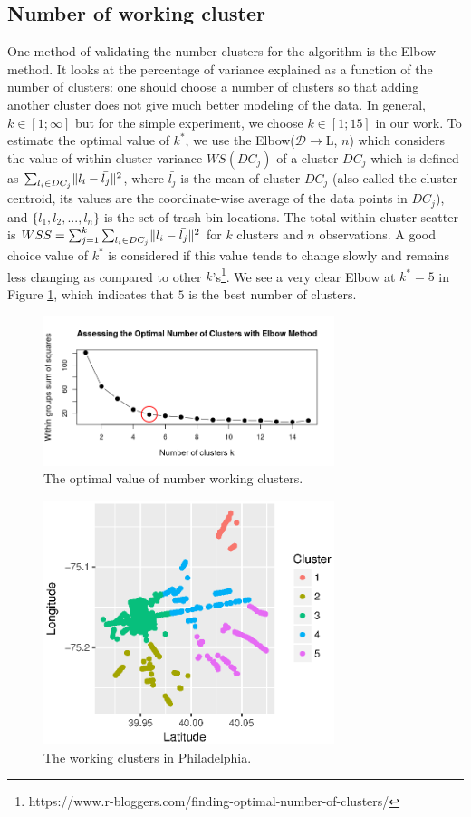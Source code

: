 \documentclass[conference]{IEEEtran}
\DeclarePairedDelimiter{\norm}{\lVert}{\rVert}
\begin{document}
\subsection{Number of working cluster}



One  method of validating the number clusters for the algorithm is the Elbow method. It looks at the percentage of variance explained as a function of the number of clusters: one should choose a number of clusters so that adding another cluster does not give much better modeling of the data. In general, $k \in [1;\infty]$ but for the simple experiment, we choose $k\in[1;15]$ in our work. To estimate the optimal value of $k^*$, we use the Elbow($\mathcal{D}\rightarrow$L, $n$) which considers the value of within-cluster variance $WS(DC_j)$ of a cluster $DC_j$ which is defined as $\sum_{l_i\in DC_j}\norm{l_i-\bar{l_j}}^2$, where $\bar{l_j}$ is the mean of cluster $DC_j$ (also called the cluster centroid, its values are the coordinate-wise average of the data points in $DC_j$), and $\{l_1, l_2,..., l_n\}$ is the set of trash bin locations. The total within-cluster scatter is $WSS = \sum_{j=1}^{k}\sum_{l_i\in DC_j}\norm{l_i-\bar{l_j}}^2$ for $k$ clusters and $n$ observations. A good choice value of $k^*$ is considered if this value tends to change slowly and remains less changing as compared to other $k$'s\footnote{https://www.r-bloggers.com/finding-optimal-number-of-clusters/}. We see a very clear Elbow at $k^* = 5$ in Figure \ref{fig3}, which indicates that $5$ is the best number of clusters.

\begin{figure}
	\centering
	\includegraphics[width=8.5cm]{elbow6}
	\caption{The optimal value of number working clusters.}
	\label{fig3}
\end{figure}

\begin{figure}
	\centering
	\includegraphics[width=8.5cm]{workingcluster3}
	\caption{The working clusters in Philadelphia.}
	\label{fig4}
\end{figure}
\end{document}
